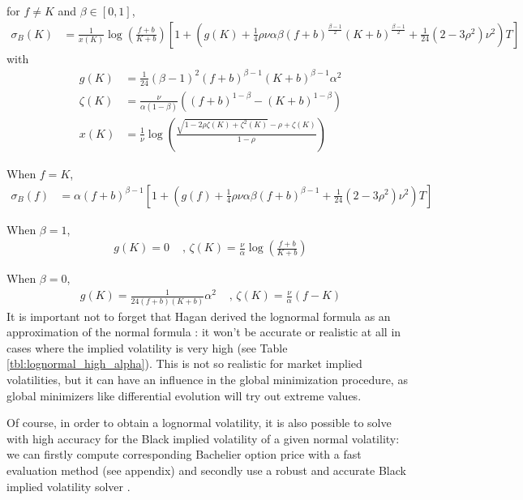 \documentclass[]{rAMF2e}
\begin{document}
for $f \neq K$ and $\beta \in [0,1]$,
\begin{align}
\sigma_B(K) &= \frac{1}{x(K)}\log(\frac{f+b}{K+b})\left[1+\left(g(K)+\frac{1}{4}\rho\nu\alpha\beta(f+b)^{\frac{\beta-1}{2}}(K+b)^{\frac{\beta-1}{2}}+\frac{1}{24}(2-3\rho^2)\nu^2\right)T\right]
\end{align}
with 
\begin{align*}
g(K) &= \frac{1}{24} (\beta-1)^2 (f+b)^{\beta-1} (K+b)^{\beta-1} \alpha^2\\
\zeta(K) &= \frac{\nu}{\alpha (1-\beta)} \left( (f+b)^{1-\beta} - (K+b)^{1-\beta} \right)\\
x(K) &= \frac{1}{\nu}\log\left(\frac{\sqrt{1-2\rho\zeta(K)+\zeta^2(K)}-\rho+\zeta(K)}{1-\rho} \right)
\end{align*}

When $f=K$, 
\begin{align}
\sigma_B(f) &= \alpha (f+b)^{\beta-1} \left[1+\left(g(f)+\frac{1}{4}\rho\nu\alpha\beta(f+b)^{\beta-1}+\frac{1}{24}(2-3\rho^2)\nu^2\right)T\right]
\end{align}

When $\beta = 1$,
\begin{align*}
g(K) = 0 &\texttt{ , } \zeta(K) = \frac{\nu}{\alpha} \log\left(\frac{f+b}{K+b}\right)
\end{align*}

When $\beta = 0$,
\begin{align*}
g(K) = \frac{1}{24(f+b)(K+b)}\alpha^2 &\texttt{ , }\zeta(K) = \frac{\nu}{\alpha} \left(f-K\right)
\end{align*}
It is important not to forget that Hagan derived the lognormal formula as an approximation of the normal formula \citep{hagan2002managing}: it won't be accurate or realistic at all in cases where the implied volatility is very high (see Table \ref{tbl:lognormal_high_alpha}). This is not so realistic for market implied volatilities, but it can have an influence in the global minimization procedure, as global minimizers like differential evolution will try out extreme values.

Of course, in order to obtain a lognormal volatility, it is also possible to solve with high accuracy for the Black implied volatility of a given normal volatility: we can firstly compute corresponding Bachelier option price with a fast evaluation method (see appendix) and secondly use a robust and accurate Black implied volatility solver \citep{jackel2013let, li2011adaptive}.
\end{document}
